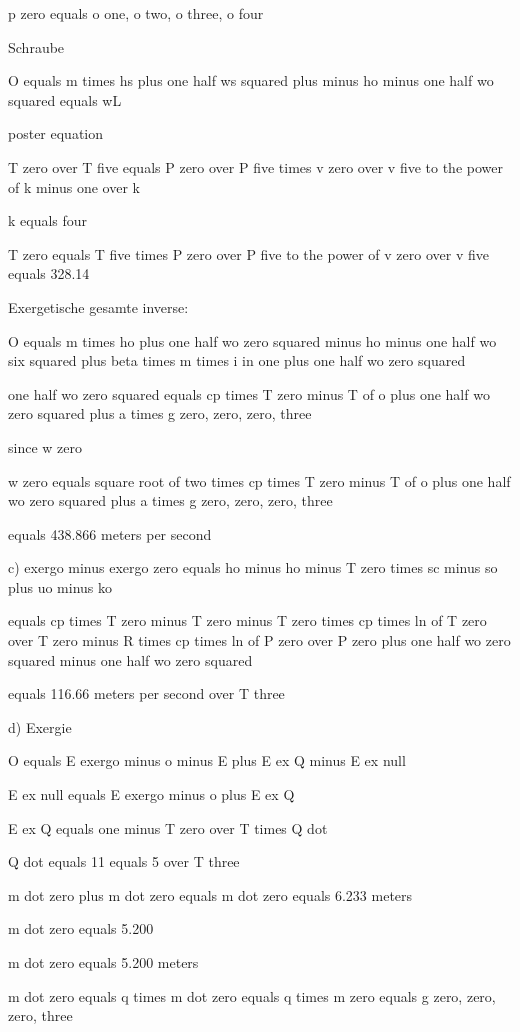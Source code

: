 p zero equals o one, o two, o three, o four

Schraube

O equals m times hs plus one half ws squared plus minus ho minus one half wo squared equals wL

poster equation

T zero over T five equals P zero over P five times v zero over v five to the power of k minus one over k

k equals four

T zero equals T five times P zero over P five to the power of v zero over v five equals 328.14

Exergetische gesamte inverse:

O equals m times ho plus one half wo zero squared minus ho minus one half wo six squared plus beta times m times i in one plus one half wo zero squared

one half wo zero squared equals cp times T zero minus T of o plus one half wo zero squared plus a times g zero, zero, zero, three

since w zero

w zero equals square root of two times cp times T zero minus T of o plus one half wo zero squared plus a times g zero, zero, zero, three

equals 438.866 meters per second

c) exergo minus exergo zero equals ho minus ho minus T zero times sc minus so plus uo minus ko

equals cp times T zero minus T zero minus T zero times cp times ln of T zero over T zero minus R times cp times ln of P zero over P zero plus one half wo zero squared minus one half wo zero squared

equals 116.66 meters per second over T three

d) Exergie

O equals E exergo minus o minus E plus E ex Q minus E ex null

E ex null equals E exergo minus o plus E ex Q

E ex Q equals one minus T zero over T times Q dot

Q dot equals 11 equals 5 over T three

m dot zero plus m dot zero equals m dot zero equals 6.233 meters

m dot zero equals 5.200

m dot zero equals 5.200 meters

m dot zero equals q times m dot zero equals q times m zero equals g zero, zero, zero, three